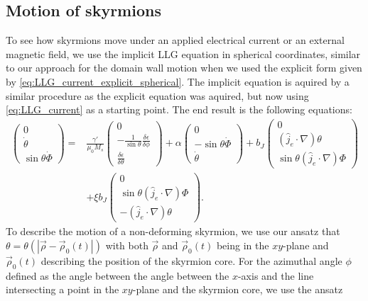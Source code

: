 \documentclass[12pt, a4paper]{article}		%
\numberwithin{equation}{section}
\begin{document}
\subsection{Motion of skyrmions}
To see how skyrmions move under an applied electrical current or an external magnetic field, we use the implicit LLG equation in spherical coordinates, similar to our approach for the domain wall motion when we used the explicit form given by \eqref{eq:LLG_current_explicit_spherical}. The implicit equation is aquired by a similar procedure as the explicit equation was aquired, but now using \eqref{eq:LLG_current} as a starting point. The end result is the following equations:
\begin{align}
\nonumber \begin{pmatrix}
0 \\ \dot{\theta} \\ \sin\theta\dot{\Phi}
\end{pmatrix} =
&\frac{\gamma'}{\mu_0 M_s}
\begin{pmatrix}
0 \\ -\frac{1}{\sin\theta} \frac{\delta \epsilon}{\delta \phi} \\ \frac{\delta \epsilon}{\delta \theta}
\end{pmatrix} + \alpha
\begin{pmatrix}
0 \\ -\sin\theta\dot{\Phi} \\ \dot{\theta}
\end{pmatrix} + b_J
\begin{pmatrix}
0 \\ (\hat{j}_e\cdot\nabla)\theta \\ \sin\theta(\hat{j}_e\cdot\nabla)\Phi
\end{pmatrix} \\
&+\xi b_J
\begin{pmatrix}
0 \\ \sin\theta(\hat{j}_e\cdot\nabla)\Phi \\ -(\hat{j}_e\cdot\nabla)\theta
\end{pmatrix}.
\label{eq:LLG_current_implicit_spherical}
\end{align}
To describe the motion of a non-deforming skyrmion, we use our ansatz that\\ $\theta = \theta(|\vec{\rho}-\vec{\rho}_0(t)|)$ with both $\vec{\rho}$ and $\vec{\rho}_0(t)$ being in the $xy$-plane and $\vec{\rho}_0(t)$ describing the position of the skyrmion core. For the azimuthal angle $\phi$ defined as the angle between the angle between the $x$-axis and the line intersecting a point in the $xy$-plane and the skyrmion core, we use the ansatz
\end{document}
